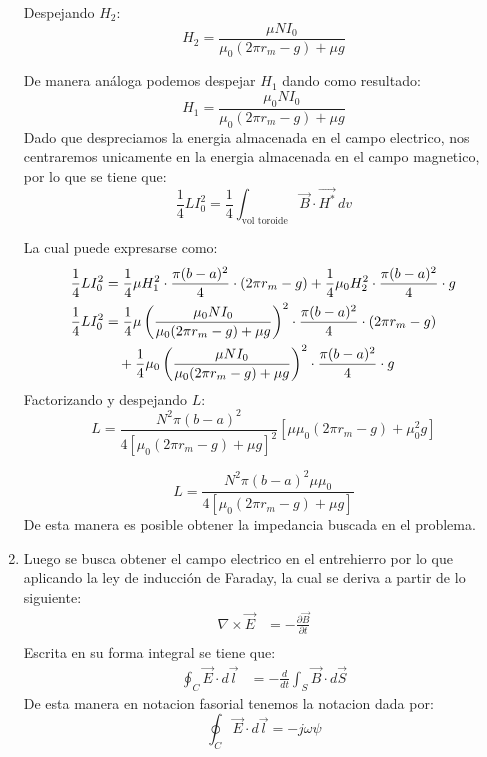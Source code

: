 \documentclass[
  11pt,
  letterpaper,
   addpoints,
   answers
  ]{exam}
\begin{document}
\begin{questions}
\begin{solution}
\begin{enumerate}
Despejando \( H_2 \):
\begin{equation}
H_2 = \frac{\mu N I_0}{\mu_0 (2\pi r_m - g) + \mu g}
\end{equation}

De manera análoga podemos despejar \( H_1 \) dando como resultado:
\begin{equation}
H_1 = \frac{\mu_0 N I_0}{\mu_0 (2\pi r_m - g) + \mu g}
\end{equation}
Dado que despreciamos la energia almacenada en el campo electrico, nos centraremos unicamente en la energia almacenada en el campo magnetico, por lo que se tiene que:
\begin{equation}
\frac{1}{4} L I_0^2 = \frac{1}{4} \int_{\text{vol toroide}} \vec{B} \cdot \vec{H^{*}} \, dv
\end{equation}

La cual puede expresarse como:
\begin{align}
\frac{1}{4} L I_0^2 &= \frac{1}{4} \mu H_1^2 \cdot \frac{\pi (b - a)^2}{4} \cdot (2\pi r_m - g) + \frac{1}{4} \mu_0 H_2^2 \cdot \frac{\pi (b - a)^2}{4} \cdot g \\
\frac{1}{4} L I_0^2 &= \frac{1}{4} \mu \left( \frac{\mu_0 N I_0}{\mu_0(2\pi r_m - g) + \mu g} \right)^2 \cdot \frac{\pi (b - a)^2}{4} \cdot (2\pi r_m - g) \notag \\
&\quad + \frac{1}{4} \mu_0 \left( \frac{\mu N I_0}{\mu_0(2\pi r_m - g) + \mu g} \right)^2 \cdot \frac{\pi (b - a)^2}{4} \cdot g
\end{align}
Factorizando y despejando \( L \):
\begin{equation}
L = \frac{N^2 \pi (b - a)^2}{4 \left[ \mu_0(2\pi r_m - g) + \mu g \right]^2} \left[ \mu \mu_0 (2\pi r_m - g) + \mu_0^2 g \right]
\end{equation}

\begin{equation}
L = \frac{N^2 \pi (b - a)^2 \mu \mu_0}{4 \left[ \mu_0(2\pi r_m - g) + \mu g \right]}
\end{equation}
De esta manera es posible obtener la impedancia buscada en el problema.
   
\item Luego se busca obtener el campo electrico en el entrehierro por lo que aplicando la ley de inducción de Faraday, la cual se deriva a partir de lo siguiente:
\begin{align}
    \nabla \times \vec{E} &= -\frac{\partial \vec{B}}{\partial t} \\
\end{align}
Escrita en su forma integral se tiene que:
\begin{align}
    \oint_C \vec{E} \cdot d\vec{l} &= -\frac{d}{dt} \int_S \vec{B} \cdot d\vec{S}
\end{align}
De esta manera en notacion fasorial tenemos la notacion dada por:
\begin{equation}
\oint_C \vec{E} \cdot d\vec{l} = -j \omega \psi
\end{equation}


\end{enumerate}
\end{solution}
\end{questions}
\end{document}
